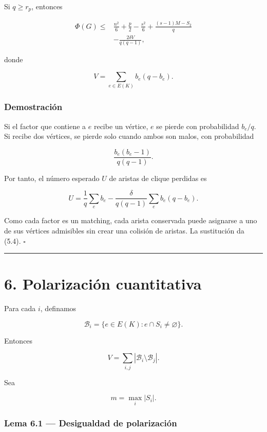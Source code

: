 \documentclass[
  11pt,
]{article}
\begin{document}
Si \(q\ge r_p\), entonces

\[
\boxed{
\begin{aligned}
\Phi(G)
\le{}&
\frac{n^2}{6}+\frac p2-\frac{s^2}{6}
+
\frac{(s-1)M-S_2}{q}\\
&-
\frac{2\delta V}{q(q-1)},
\end{aligned}
}
\tag{5.4}
\]

donde

\[
V=\sum_{e\in E(K)}b_e(q-b_e).
\tag{5.5}
\]

\subsubsection{Demostración}\label{demostraciuxf3n-4}

Si el factor que contiene a \(e\) recibe un vértice, \(e\) se pierde con
probabilidad \(b_e/q\). Si recibe dos vértices, se pierde solo cuando
ambos son malos, con probabilidad

\[
\frac{b_e(b_e-1)}{q(q-1)}.
\]

Por tanto, el número esperado \(U\) de aristas de clique perdidas es

\[
U
=
\frac1q\sum_e b_e
-
\frac{\delta}{q(q-1)}\sum_e b_e(q-b_e).
\]

Como cada factor es un matching, cada arista conservada puede asignarse
a uno de sus vértices admisibles sin crear una colisión de aristas. La
sustitución da (5.4). \(\square\)

\begin{center}\rule{0.5\linewidth}{0.5pt}\end{center}

\section{6. Polarización
cuantitativa}\label{polarizaciuxf3n-cuantitativa}

Para cada \(i\), definamos

\[
\mathcal B_i=\{e\in E(K):e\cap S_i\ne\varnothing\}.
\]

Entonces

\[
V=\sum_{i,j}|\mathcal B_i\setminus\mathcal B_j|.
\tag{6.1}
\]

Sea

\[
m=\max_i|S_i|.
\]

\subsubsection{Lema 6.1 --- Desigualdad de
polarización}\label{lema-6.1-desigualdad-de-polarizaciuxf3n}
\end{document}
